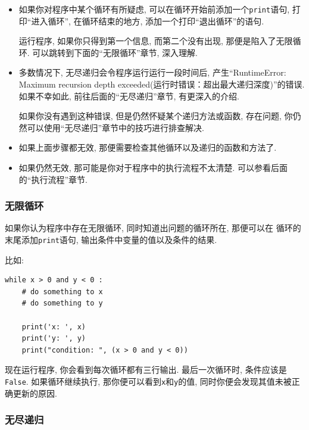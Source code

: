 \documentclass[10pt]{book}
\begin{document}
\begin{itemize}

\item 如果你对程序中某个循环有所疑虑, 可以在循环开始前添加一个{\tt print}语句, 
打印``进入循环'', 在循环结束的地方, 添加一个打印``退出循环''的语句. 

运行程序, 如果你只得到第一个信息, 而第二个没有出现, 
那便是陷入了无限循环. 可以跳转到下面的``无限循环''章节, 深入理解. 

\item 多数情况下, 无尽递归会令程序运行运行一段时间后, 产生``RuntimeError: Maximum
recursion depth exceeded(运行时错误：超出最大递归深度)''的错误. 
如果不幸如此, 前往后面的``无尽递归''章节, 有更深入的介绍. 

如果你没有遇到这种错误, 但是仍然怀疑某个递归方法或函数, 存在问题, 
你仍然可以使用``无尽递归''章节中的技巧进行排查解决. 

\item 如果上面步骤都无效, 那便需要检查其他循环以及递归的函数和方法了. 

\item 如果仍然无效, 那可能是你对于程序中的执行流程不太清楚. 
可以参看后面的``执行流程''章节. 
\end{itemize}


\subsubsection{无限循环}

如果你认为程序中存在无限循环, 同时知道出问题的循环所在, 那便可以在
循环的末尾添加{\tt print}语句, 输出条件中变量的值以及条件的结果. 

比如:

\begin{verbatim}
while x > 0 and y < 0 :
    # do something to x
    # do something to y

    print('x: ', x)
    print('y: ', y)
    print("condition: ", (x > 0 and y < 0))
\end{verbatim}
%
现在运行程序, 你会看到每次循环都有三行输出. 
最后一次循环时, 条件应该是{\tt False}.
如果循环继续执行, 那你便可以看到{\tt x}和{\tt y}的值, 
同时你便会发现其值未被正确更新的原因.


\subsubsection{无尽递归}
\end{document}
